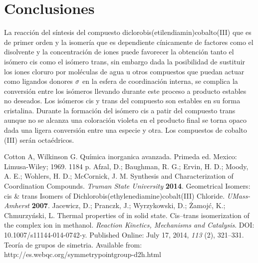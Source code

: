 \documentclass[fleqn,10pt]{SelfArx} %
\begin{document}
	\section{Conclusiones}
    La reacción del síntesis del compuesto \newline diclorobis(etilendiamin)cobalto(III) que es de primer orden y la isomería que es dependiente cínicamente de factores como el disolvente y la concentración de iones puede favorecer la obtención tanto el isómero cis como el isómero trans, sin embargo dada la posibilidad de sustituir los iones cloruro por moléculas de agua u otros compuestos que puedan actuar como ligandos donores $\ce{\sigma}$ en la esfera de coordinación interna, se complica la conversión entre los isómeros llevando durante este proceso a producto estables no deseados. Los isómeros cis y trans del compuesto son estables en su forma cristalina. Durante la formación del isómero cis a patir del compuesto trans  aunque no se alcanza una coloración violeta en el producto final se torna opaco dada una ligera conversión entre una especie y otra. Los compuestos de cobalto (III) serán octaédricos.
	
	\begin{thebibliography}{9}
        Cotton A, Wilkinson G. Química inorganica avanzada. Primeda ed. Mexico: Limusa-Wiley; 1969. 1184 p. 
	    Afzal, D.; Baughman, R. G.; Ervin, H. D.; Moody, A. E.; Wohlers, H. D.; McCornick, J. M. Synthesis and Characterization of Coordination Compounds. \textit{Truman State University} \textbf{2014}.
	    Geometrical Isomers: cis & trans Isomers of Dichlorobis(ethylenediamine)cobalt(III) Chloride. \textit{UMass-Amherst} \textbf{2007}.
	    Jacewicz, D.; Pranczk, J.; Wyrzykowski, D.; Żamojć, K.; Chmurzyński, L. Thermal properties of  in solid state. Cis–trans isomerization of the \ce{[Co(en)2Cl2]+} complex ion in methanol. \textit{Reaction Kinetics, Mechanisms and Catalysis}. DOI: 10.1007/s11144-014-0742-y. Published Online: July 17, 2014, \textit{113} (2), 321–331.
	    Teoría de grupos de simetria. Available from: http://es.webqc.org/symmetrypointgroup-d2h.html
	\end{thebibliography}
\end{document}
